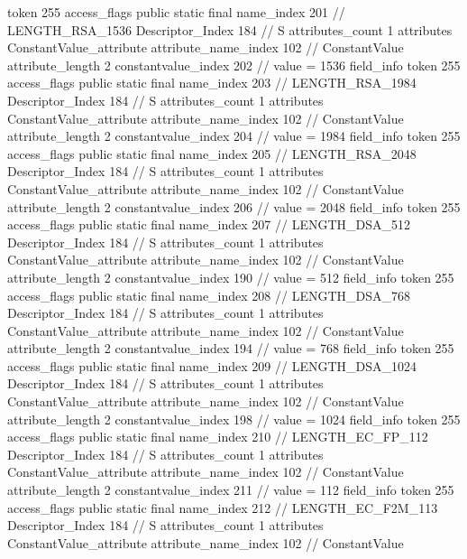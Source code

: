 {{{{{				token	255
				access_flags	public static final
				name_index	201		// LENGTH_RSA_1536
				Descriptor_Index	184		// S
				attributes_count	1
				attributes {
				ConstantValue_attribute {
					attribute_name_index	102		// ConstantValue
					attribute_length	2
					constantvalue_index	202		// value = 1536
				}
				}
			}
			field_info {
				token	255
				access_flags	public static final
				name_index	203		// LENGTH_RSA_1984
				Descriptor_Index	184		// S
				attributes_count	1
				attributes {
				ConstantValue_attribute {
					attribute_name_index	102		// ConstantValue
					attribute_length	2
					constantvalue_index	204		// value = 1984
				}
				}
			}
			field_info {
				token	255
				access_flags	public static final
				name_index	205		// LENGTH_RSA_2048
				Descriptor_Index	184		// S
				attributes_count	1
				attributes {
				ConstantValue_attribute {
					attribute_name_index	102		// ConstantValue
					attribute_length	2
					constantvalue_index	206		// value = 2048
				}
				}
			}
			field_info {
				token	255
				access_flags	public static final
				name_index	207		// LENGTH_DSA_512
				Descriptor_Index	184		// S
				attributes_count	1
				attributes {
				ConstantValue_attribute {
					attribute_name_index	102		// ConstantValue
					attribute_length	2
					constantvalue_index	190		// value = 512
				}
				}
			}
			field_info {
				token	255
				access_flags	public static final
				name_index	208		// LENGTH_DSA_768
				Descriptor_Index	184		// S
				attributes_count	1
				attributes {
				ConstantValue_attribute {
					attribute_name_index	102		// ConstantValue
					attribute_length	2
					constantvalue_index	194		// value = 768
				}
				}
			}
			field_info {
				token	255
				access_flags	public static final
				name_index	209		// LENGTH_DSA_1024
				Descriptor_Index	184		// S
				attributes_count	1
				attributes {
				ConstantValue_attribute {
					attribute_name_index	102		// ConstantValue
					attribute_length	2
					constantvalue_index	198		// value = 1024
				}
				}
			}
			field_info {
				token	255
				access_flags	public static final
				name_index	210		// LENGTH_EC_FP_112
				Descriptor_Index	184		// S
				attributes_count	1
				attributes {
				ConstantValue_attribute {
					attribute_name_index	102		// ConstantValue
					attribute_length	2
					constantvalue_index	211		// value = 112
				}
				}
			}
			field_info {
				token	255
				access_flags	public static final
				name_index	212		// LENGTH_EC_F2M_113
				Descriptor_Index	184		// S
				attributes_count	1
				attributes {
				ConstantValue_attribute {
					attribute_name_index	102		// ConstantValue
}}}}}}}
